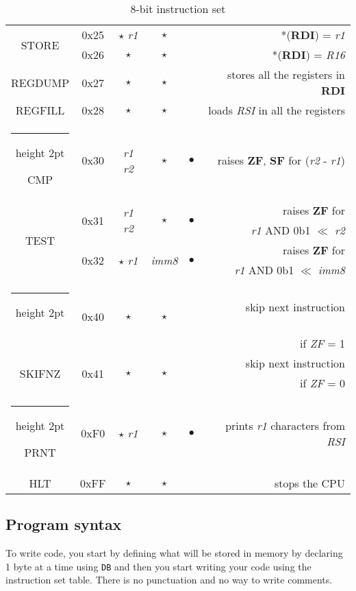 \documentclass[a4paper,12pt]{article}
\makeatletter
\newcommand{\thickhline}{%
    \noalign {\ifnum 0=`}\fi \hrule height 2pt
    \futurelet \reserved@a \@xhline
}
\makeatother
\begin{document}
\begin{table}[H]
\begin{tabular}{|c|c|c|c|c|r|}
        \hline
        \multirow{2}{*}{STORE} & 0x25 & $\star$ \quad \textit{r1} & $\star$ & & *(\textbf{RDI}) = \textit{r1}\\
        \cline{2-6}
                             & 0x26 & $\star$ & $\star$ & & *(\textbf{RDI}) = \textit{R16}\\
        \hline
        REGDUMP & 0x27 & $\star$ & $\star$ & & stores all the registers in \textbf{RDI}\\
        \hline
        REGFILL & 0x28 & $\star$ & $\star$ & & loads \textit{RSI} in all the registers\\
        \thickhline
        CMP & 0x30 & \textit{r1} \quad \textit{r2} & $\star$ & $\bullet$ & raises \textbf{ZF}, \textbf{SF} for (\textit{r2} - \textit{r1})\\
        \hline
        \multirow{4}{*}{TEST} & \multirow{2}{*}{0x31} & \multirow{2}{*}{\textit{r1} \quad \textit{r2}} & \multirow{2}{*}{$\star$} & \multirow{2}{*}{$\bullet$} & raises \textbf{ZF} for \\
         & & & & & \textit{r1} AND 0b1 $\ll$ \textit{r2}\\
        \cline{2-6}
                             & \multirow{2}{*}{0x32} & \multirow{2}{*}{$\star$ \quad \textit{r1}} & \multirow{2}{*}{\textit{imm8}} & \multirow{2}{*}{$\bullet$} & raises \textbf{ZF} for \\
                             & & & & & \textit{r1} AND 0b1 $\ll$ \textit{imm8}\\
        \thickhline
        \multirow{2}{*}{SKIFZ} & \multirow{2}{*}{0x40} & \multirow{2}{*}{$\star$} & \multirow{2}{*}{$\star$} & & skip next instruction\\
         & & & & & if \textit{ZF} = 1\\
        \cline{2-6}
        \multirow{2}{*}{SKIFNZ} & \multirow{2}{*}{0x41} & \multirow{2}{*}{$\star$} & \multirow{2}{*}{$\star$} & & skip next instruction\\
         & & & & & if \textit{ZF} = 0\\
        \cline{2-6}
        \thickhline

        PRNT & 0xF0 & $\star$ \quad \textit{r1} & $\star$ & $\bullet$ & prints \textit{r1} characters from \textit{RSI}\\
        \hline

        HLT & 0xFF & $\star$ & $\star$ & & stops the CPU\\
        \hline  
    \end{tabular}
    \caption{8-bit instruction set}
    \label{tab:8bit_instructions}
\end{table}

\subsection{Program syntax}

To write code, you start by defining what will be stored in memory by declaring 1 byte at a time using \texttt{DB} and then you start writing your code using the instruction set table. There is no punctuation and no way to write comments.
\end{document}
